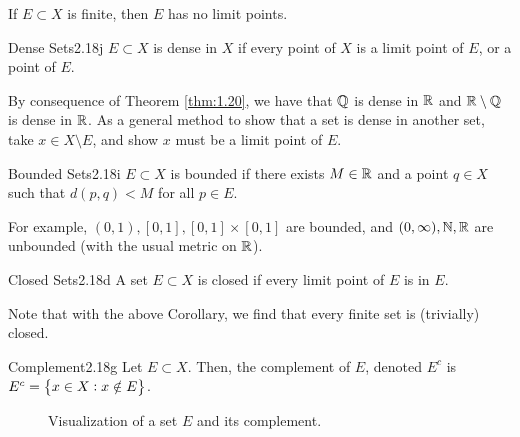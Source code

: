 \begin{ncorollary}{}{}
    If $E \subset X$ is finite, then $E$ has no limit points.
\end{ncorollary}

\setcounter{rudin}{17}
\begin{definition}{Dense Sets}{2.18j}
    $E \subset X$ is dense in $X$ if every point of $X$ is a limit point of $E$, or a point of $E$.
\end{definition}
\noindent By consequence of Theorem \ref{thm:1.20}, we have that $\mathbb{Q}$ is dense in $\mathbb{R}$ and $\mathbb{R} \setminus \mathbb{Q}$ is dense in $\mathbb{R}$. As a general method to show that a set is dense in another set, take $x \in X \setminus E$, and show $x$ must be a limit point of $E$.

\setcounter{rudin}{17}
\begin{definition}{Bounded Sets}{2.18i}
    $E \subset X$ is bounded if there exists $M \in \mathbb{R}$ and a point $q \in X$ such that $d(p, q) < M$ for all $p \in E$.
\end{definition}
\noindent For example, $(0, 1), [0, 1], [0, 1] \times [0, 1]$ are bounded, and $(0, \infty), \mathbb{N}, \mathbb{R}$ are unbounded (with the usual metric on $\mathbb{R}$). 

\setcounter{rudin}{17}
\begin{definition}{Closed Sets}{2.18d}
    A set $E \subset X$ is closed if every limit point of $E$ is in $E$. 
\end{definition}
\noindent Note that with the above Corollary, we find that every finite set is (trivially) closed.

\setcounter{rudin}{17}
\begin{definition}{Complement}{2.18g}
    Let $E \subset X$. Then, the complement of $E$, denoted $E^c$ is $E^c = \set{x \in X: x \notin E}$. 
\end{definition}
\begin{figure}[htbp]
    \centering
    
    \caption{Visualization of a set $E$ and its complement.}
    \label{fig8}
\end{figure}

